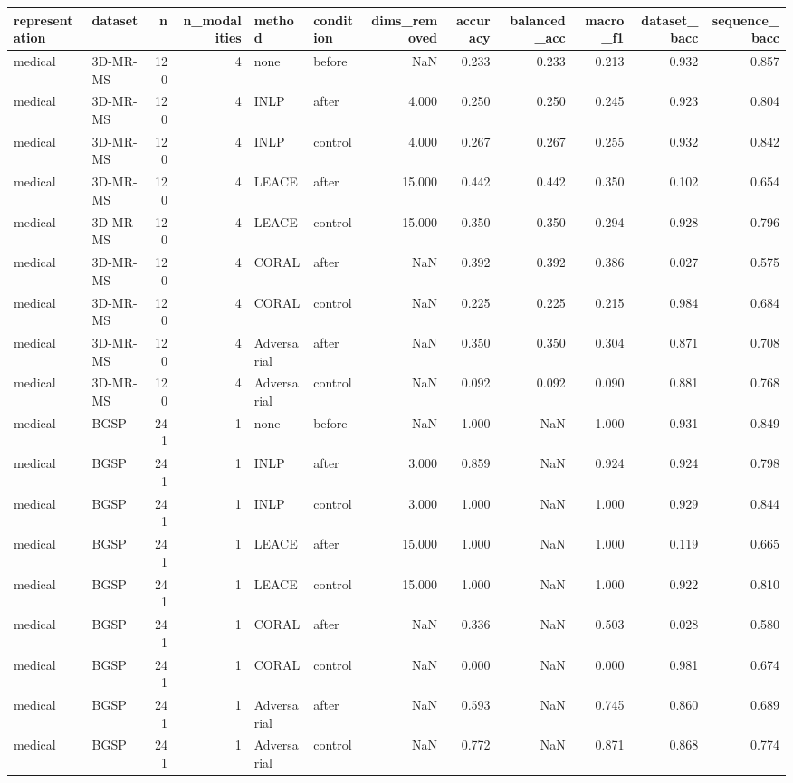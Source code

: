 \begin{tabular}{llrrllrrrrrr}
\toprule
representation & dataset & n & n\_modalities & method & condition & dims\_removed & accuracy & balanced\_acc & macro\_f1 & dataset\_bacc & sequence\_bacc \\
\midrule
medical & 3D-MR-MS & 120 & 4 & none & before & NaN & 0.233 & 0.233 & 0.213 & 0.932 & 0.857 \\
medical & 3D-MR-MS & 120 & 4 & INLP & after & 4.000 & 0.250 & 0.250 & 0.245 & 0.923 & 0.804 \\
medical & 3D-MR-MS & 120 & 4 & INLP & control & 4.000 & 0.267 & 0.267 & 0.255 & 0.932 & 0.842 \\
medical & 3D-MR-MS & 120 & 4 & LEACE & after & 15.000 & 0.442 & 0.442 & 0.350 & 0.102 & 0.654 \\
medical & 3D-MR-MS & 120 & 4 & LEACE & control & 15.000 & 0.350 & 0.350 & 0.294 & 0.928 & 0.796 \\
medical & 3D-MR-MS & 120 & 4 & CORAL & after & NaN & 0.392 & 0.392 & 0.386 & 0.027 & 0.575 \\
medical & 3D-MR-MS & 120 & 4 & CORAL & control & NaN & 0.225 & 0.225 & 0.215 & 0.984 & 0.684 \\
medical & 3D-MR-MS & 120 & 4 & Adversarial & after & NaN & 0.350 & 0.350 & 0.304 & 0.871 & 0.708 \\
medical & 3D-MR-MS & 120 & 4 & Adversarial & control & NaN & 0.092 & 0.092 & 0.090 & 0.881 & 0.768 \\
medical & BGSP & 241 & 1 & none & before & NaN & 1.000 & NaN & 1.000 & 0.931 & 0.849 \\
medical & BGSP & 241 & 1 & INLP & after & 3.000 & 0.859 & NaN & 0.924 & 0.924 & 0.798 \\
medical & BGSP & 241 & 1 & INLP & control & 3.000 & 1.000 & NaN & 1.000 & 0.929 & 0.844 \\
medical & BGSP & 241 & 1 & LEACE & after & 15.000 & 1.000 & NaN & 1.000 & 0.119 & 0.665 \\
medical & BGSP & 241 & 1 & LEACE & control & 15.000 & 1.000 & NaN & 1.000 & 0.922 & 0.810 \\
medical & BGSP & 241 & 1 & CORAL & after & NaN & 0.336 & NaN & 0.503 & 0.028 & 0.580 \\
medical & BGSP & 241 & 1 & CORAL & control & NaN & 0.000 & NaN & 0.000 & 0.981 & 0.674 \\
medical & BGSP & 241 & 1 & Adversarial & after & NaN & 0.593 & NaN & 0.745 & 0.860 & 0.689 \\
medical & BGSP & 241 & 1 & Adversarial & control & NaN & 0.772 & NaN & 0.871 & 0.868 & 0.774 \\

\end{tabular}
